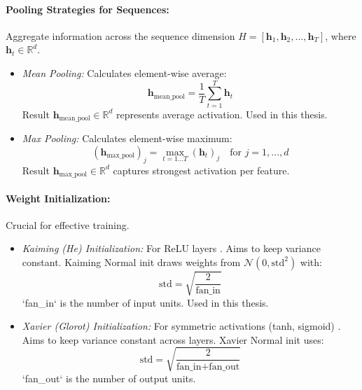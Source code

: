 \begin{appendices}
  \paragraph{Pooling Strategies for Sequences:}
  Aggregate information across the sequence dimension \( H = [\bm{h}_1, \bm{h}_2, ..., \bm{h}_T] \), where \( \bm{h}_t \in \mathbb{R}^d \).
  \begin{itemize}
    \item \textit{Mean Pooling:} Calculates element-wise average:
          \begin{equation}
            \bm{h}_{\text{mean\_pool}} = \frac{1}{T} \sum_{t=1}^T \bm{h}_t %
          \end{equation}
          Result \( \bm{h}_{\text{mean\_pool}} \in \mathbb{R}^d \) represents average activation. Used in this thesis.
    \item \textit{Max Pooling:} Calculates element-wise maximum:
          \begin{equation}
            (\bm{h}_{\text{max\_pool}})_j = \max_{t=1...T} (\bm{h}_t)_j \quad \text{for } j = 1, ..., d %
          \end{equation}
          Result \( \bm{h}_{\text{max\_pool}} \in \mathbb{R}^d \) captures strongest activation per feature.
  \end{itemize}

  \paragraph{Weight Initialization:} Crucial for effective training.
  \begin{itemize}
    \item \textit{Kaiming (He) Initialization:} For ReLU layers \autocite{he2015delving}. Aims to keep variance constant. Kaiming Normal init draws weights from \( \mathcal{N}(0, \text{std}^2) \) with:
          \begin{equation}
            \text{std} = \sqrt{\frac{2}{\text{fan\_in}}} %
          \end{equation}
          `fan\_in` is the number of input units. Used in this thesis.
    \item \textit{Xavier (Glorot) Initialization:} For symmetric activations (tanh, sigmoid) \autocite{glorot2010understanding}. Aims to keep variance constant across layers. Xavier Normal init uses:
          \begin{equation}
            \text{std} = \sqrt{\frac{2}{\text{fan\_in} + \text{fan\_out}}} %
          \end{equation}
          `fan\_out` is the number of output units.
  \end{itemize}


\end{appendices}
